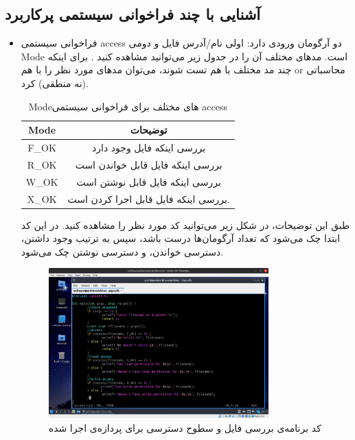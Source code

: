 \documentclass[12pt]{article}
\begin{document}
        \subsection{آشنایی با چند فراخوانی سیستمی پرکاربرد}
        \begin{itemize}
        \item 
        
        
        فراخوانی سیستمی 
        \textenglish{access}
        دو آرگومان ورودی دارد: اولی نام/آدرس فایل و دومی 
        \textenglish{Mode}
        است. مدهای مختلف آن را در جدول زیر می‌توانید مشاهده کنید
        \cite{linux-man-access}
        . برای اینکه چند مد مختلف با هم تست شوند، می‌توان مدهای مورد نظر را با هم 
        \textenglish{or}
        محاسباتی (نه منطقی)
        کرد.

        \begin{table}[h!]
            \centering
            \begin{tabular}{|c|c|}
            \hline
            \textenglish{}{Mode} & توضیحات \\
            \hline
            \textenglish{F\_OK} & بررسی اینکه فایل وجود دارد \\
            \hline
            \textenglish{R\_OK} & بررسی اینکه فایل قابل خواندن است \\
            \hline
            \textenglish{W\_OK} & بررسی اینکه فایل قابل نوشتن است \\
            \hline
            \textenglish{X\_OK} & بررسی اینکه فایل قابل اجرا کردن است. \\
            \hline
            \end{tabular}
            \caption{\textenglish{Mode}های مختلف برای فراخوانی سیستمی \textenglish{access}}
        \end{table}

        طبق این توضیحات، در شکل زیر می‌توانید کد مورد نظر را مشاهده کنید. در این کد ابتدا چک می‌شود که تعداد آرگومان‌ها درست باشد، سپس به ترتیب وجود داشتن،‌ دسترسی خواندن، و دسترسی نوشتن چک می‌شود.

        \begin{figure}[H]
		\centering
		\includegraphics[width=0.8\textwidth]{report2-resources/7.png}
		\caption{کد برنامه‌ی بررسی فایل و سطوح دسترسی برای پردازه‌ی اجرا شده}
	\end{figure}


\end{itemize}
\end{document}
